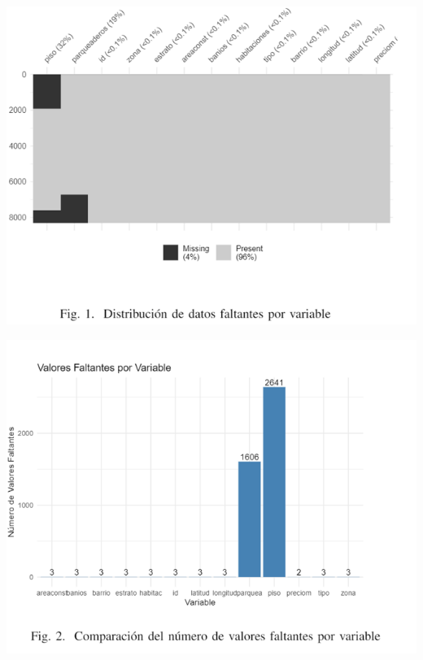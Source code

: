 \documentclass[conference,final,]{IEEEtran}
\begin{document}
\begin{center}\includegraphics[width=1\linewidth]{images/ComparacionDatosFaltantesVariable} \end{center}

\begin{flushright}\includegraphics[width=1\linewidth]{images/GraficoBarrasFaltantes} \end{flushright}
\end{document}
